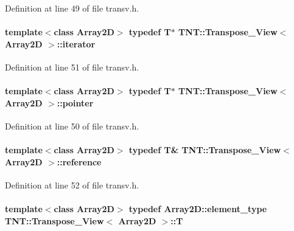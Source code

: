 Definition at line 49 of file transv.h.

\paragraph[{iterator}]{\setlength{\rightskip}{0pt plus 5cm}template$<$class Array2D$>$ typedef {\bf T}$\ast$ {\bf TNT::Transpose\_\-View}$<$ Array2D $>$::{\bf iterator}}\hfill\label{class_t_n_t_1_1_transpose___view_a639d17bd5a79b02d3d6f52a18a10d578}


Definition at line 51 of file transv.h.

\paragraph[{pointer}]{\setlength{\rightskip}{0pt plus 5cm}template$<$class Array2D$>$ typedef {\bf T}$\ast$ {\bf TNT::Transpose\_\-View}$<$ Array2D $>$::{\bf pointer}}\hfill\label{class_t_n_t_1_1_transpose___view_af9d41194fce8c4a880fa810ec4733ef1}


Definition at line 50 of file transv.h.

\paragraph[{reference}]{\setlength{\rightskip}{0pt plus 5cm}template$<$class Array2D$>$ typedef {\bf T}\& {\bf TNT::Transpose\_\-View}$<$ Array2D $>$::{\bf reference}}\hfill\label{class_t_n_t_1_1_transpose___view_a69899e03b1d06e813ca3952666a85c39}


Definition at line 52 of file transv.h.

\paragraph[{T}]{\setlength{\rightskip}{0pt plus 5cm}template$<$class Array2D$>$ typedef Array2D::element\_\-type {\bf TNT::Transpose\_\-View}$<$ Array2D $>$::{\bf T}}\hfill\label{class_t_n_t_1_1_transpose___view_aed45bbf8d9e4548019f46484862be300}


